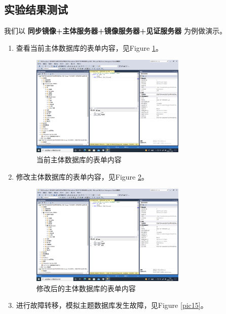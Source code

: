 \documentclass[onecolumn,oneside]{BUPTHomework}
\begin{document}
  \subsection{实验结果测试}

  我们以 \textbf{同步镜像+主体服务器+镜像服务器+见证服务器} 为例做演示。

  \begin{enumerate}

  \item 查看当前主体数据库的表单内容，见Figure \ref{pic13}。

  \begin{figure}[h]
    \centering
    \includegraphics[width=0.70\textwidth]{image/pic13.png}
    \caption{当前主体数据库的表单内容}
    \label{pic13}
  \end{figure}

  \item 修改主体数据库的表单内容，见Figure \ref{pic14}。
  
  \newpage

  \begin{figure}[h]
    \centering
    \includegraphics[width=0.70\textwidth]{image/pic14.png}
    \caption{修改后的主体数据库的表单内容}
    \label{pic14}
  \end{figure}

  \item 进行故障转移，模拟主题数据库发生故障，见Figure \ref{pic15}。


\end{enumerate}
\end{document}

